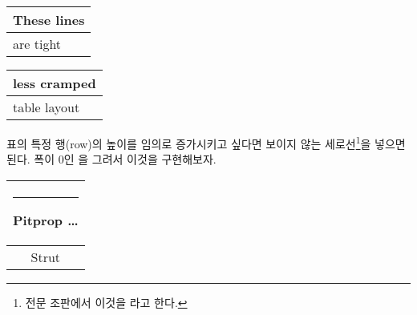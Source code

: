 

\begin{example}
\begin{tabular}{|l|}
\hline
These lines\\\hline
are tight\\\hline
\end{tabular}

{\renewcommand{\arraystretch}{1.5}
\renewcommand{\tabcolsep}{0.2cm}
\begin{tabular}{|l|}
\hline
less cramped\\\hline
table layout\\\hline
\end{tabular}}

\end{example}

표의 특정 행(row)의 높이를 임의로 증가시키고 싶다면 보이지 않는 세로선\footnote{전문 조판에서 이것을 라고 한다.}을 넣으면 된다.
폭이 0인 을 그려서 이것을 구현해보자.\label{strutrule}

\begin{example}
\begin{tabular}{|c|}
\hline
\rule{1pt}{4ex}Pitprop \ldots\\
\hline
\rule{0pt}{4ex}Strut\\
\hline
\end{tabular}
\end{example}

